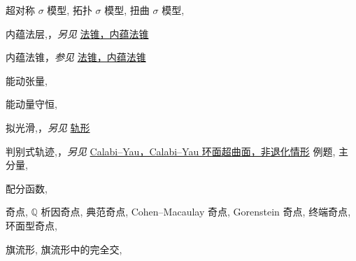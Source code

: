 \begin{theindex}
\subitem \leavevmode\hypertarget{idx:1254}{超对称 $\sigma$ 模型},\enspace{}
\subitem \leavevmode\hypertarget{idx:1255}{拓扑 $\sigma$ 模型},\enspace{}
\subitem \leavevmode\hypertarget{idx:1256}{扭曲 $\sigma$ 模型},\enspace{}
\indexspace
\item \leavevmode\hypertarget{idx:0640}{内蕴法层},\enspace{}，\textit{另见} \hyperlink{idx:0948}{法锥，内蕴法锥}
\indexspace
\item \leavevmode\hypertarget{idx:0639}{内蕴法锥}，\textit{参见} \hyperlink{idx:0948}{法锥，内蕴法锥}
\indexspace
\item \leavevmode\hypertarget{idx:0240}{能动张量},\enspace{}
\indexspace
\item \leavevmode\hypertarget{idx:0239}{能动量守恒},\enspace{}
\indexspace
\item \leavevmode\hypertarget{idx:1163}{拟光滑},\enspace{}，\textit{另见} \hyperlink{idx:0990}{轨形}
\indexspace
\item \leavevmode\hypertarget{idx:0214}{判别式轨迹},\enspace{}，\textit{另见} \hyperlink{idx:0103}{Calabi--Yau，Calabi--Yau 环面超曲面，非退化情形}
\subitem \leavevmode\hypertarget{idx:0215}{例题},\enspace{}
\subitem \leavevmode\hypertarget{idx:0216}{主分量},\enspace{}
\indexspace
\item \leavevmode\hypertarget{idx:1036}{配分函数},\enspace{}
\indexspace
\item \leavevmode\hypertarget{idx:1257}{奇点},\enspace{}
\subitem \leavevmode\hypertarget{idx:1258}{$\mathbb Q$ 析因奇点},\enspace{}
\subitem \leavevmode\hypertarget{idx:1259}{典范奇点},\enspace{}
\subitem \leavevmode\hypertarget{idx:1260}{Cohen--Macaulay 奇点},\enspace{}
\subitem \leavevmode\hypertarget{idx:1261}{Gorenstein 奇点},\enspace{}
\subitem \leavevmode\hypertarget{idx:1262}{终端奇点},\enspace{}
\subitem \leavevmode\hypertarget{idx:1263}{环面型奇点},\enspace{}
\indexspace
\item \leavevmode\hypertarget{idx:0324}{旗流形},\enspace{}
\subitem \leavevmode\hypertarget{idx:0325}{旗流形中的完全交},\enspace{}

\end{theindex}
